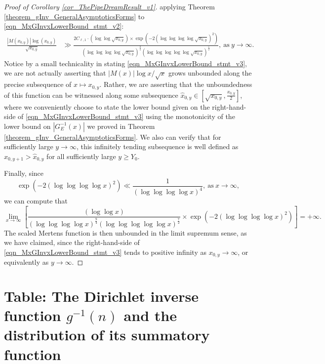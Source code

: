\documentclass[11pt,reqno,a4letter]{article}
\numberwithin{figure}{section}
\numberwithin{table}{section}
\theoremstyle{plain}
\numberwithin{theorem}{section}
\theoremstyle{definition}
\begin{document}
\begin{proof}[Proof of Corollary \ref{cor_ThePipeDreamResult_v1}]
applying Theorem \ref{theorem_gInv_GeneralAsymptoticsForms} to 
\eqref{eqn_MxGInvxLowerBound_stmt_v2}: 
\begin{align} 
\label{eqn_MxGInvxLowerBound_stmt_v3} 
\frac{|M(x_{0,y})| \log(x_{0,y})}{\sqrt{x_{0,y}}} & \gg 
     \frac{2 C_{\ell,1} \cdot (\log\log \sqrt{x_{0,y}} ) \times 
     \exp\left(-2 (\log\log\log\log \sqrt{x_{0,y}})^2\right)}{ 
     (\log\log\log\log \sqrt{x_{0,y}})^{\frac{9}{4}} 
     (\log\log\log\log\log \sqrt{x_{0,y}})^{\frac{7}{2}}} , 
     \mathrm{\ as\ } y \rightarrow \infty. 
\end{align} 
Notice by a small technicality in stating \eqref{eqn_MxGInvxLowerBound_stmt_v3}, 
we are not actually asserting that 
$|M(x)| \log x / \sqrt{x}$ grows unbounded along the precise subsequence of 
$x \mapsto x_{0,y}$. Rather, we are asserting that the unboundedness of this function 
can be witnessed along some subsequence 
$\hat{x}_{0,y} \in \left[\sqrt{x_{0,y}}, \frac{x_{0,y}}{2}\right]$, where we conveniently 
choose to state the lower bound given on the right-hand-side of 
\eqref{eqn_MxGInvxLowerBound_stmt_v3} using the 
monotonicity of the lower bound on $|G_E^{-1}(x)|$ we proved in 
Theorem \ref{theorem_gInv_GeneralAsymptoticsForms}. 
We also can verify that for sufficiently large $y \rightarrow \infty$, this infinitely 
tending subsequence is well defined as $\hat{x}_{0,y+1} > \hat{x}_{0,y}$ for all 
sufficiently large $y \geq Y_0$. 

Finally, since 
\[
\exp\left(-2 (\log\log\log\log x)^2\right) \ll \frac{1}{(\log\log\log\log x)^4}, 
     \mathrm{\ as\ } x \rightarrow \infty, 
\]
we can compute that 
\[
\lim_{x \rightarrow \infty} \left[\frac{(\log\log x)}{(\log\log\log\log x)^{\frac{9}{4}} 
     (\log\log\log\log\log x)^{\frac{7}{2}}} \times \exp\left(-2 (\log\log\log\log x)^2\right) 
     \right] = +\infty. 
\]
The scaled Mertens function is then 
unbounded in the limit supremum sense, as we have claimed, since the right-hand-side of 
\eqref{eqn_MxGInvxLowerBound_stmt_v3} tends to positive infinity as 
$x_{0,y} \rightarrow \infty$, or equivalently as $y \rightarrow \infty$. 
\end{proof} 

\newpage 
\renewcommand{\refname}{References} 
{}


\newpage
\setcounter{section}{0} 
\renewcommand{\thesection}{T.\arabic{section}} 

\newpage
\section{Table: The Dirichlet inverse function $g^{-1}(n)$ and the 
         distribution of its summatory function} 
\label{table_conjecture_Mertens_ginvSeq_approx_values}
\end{document}
